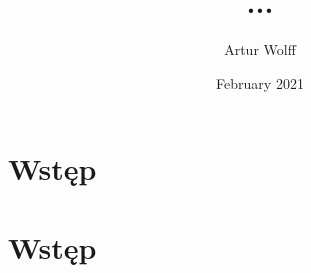 \documentclass[12pt,twoside,a4paper,polish]{report}
\title{...}
\author{Artur Wolff}
\date{February 2021}
\begin{document}
\chapter*{Wstęp}
\chapter*{Wstęp}
\tableofcontents
\end{document}
